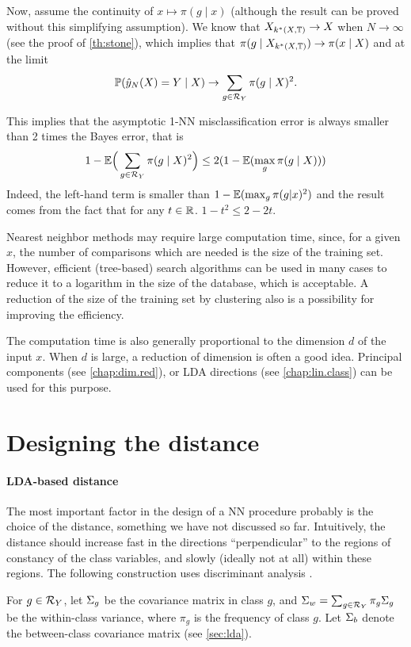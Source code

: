 Now, assume the continuity of $x\mapsto \pi(g\mid x)$ (although the result
can be proved without this
simplifying assumption). We know that $X_{k^*(X,{\mathbb T})} \to X$ when
$N\to\infty$ (see the proof of \cref{th:stone}), which implies that
$\pi(g\mid X_{k^*(X,{\mathbb T})}) \to \pi(x\mid X)$ and at the limit
$$\bm{\mathbb P}(\hat y_N(X) = Y\mid X) \to \sum_{g\in {\mathcal R}_Y} \pi( g\mid X)^2 .$$

This implies that the asymptotic 1-NN misclassification error is always smaller
than 2 times the Bayes error, that is
$$
1- \bm{\mathbb E}\Big(\sum_{g\in {\mathcal R}_Y} \pi( g\mid X)^2 \Big) \leq 2(1- \bm{\mathbb E}(\max_g \pi(
g\mid X) ))
$$
Indeed, the left-hand term is smaller than $1- \bm{\mathbb E}(\max_g \pi(g|x)^2)$
and the result comes from the fact that for any $t\in{\mathbb{R}}$. $1-t^2
\leq 2 - 2t$.

\begin{remark}
\label{rem:nn.comp}
Nearest neighbor methods may require large computation time, since, for a given $x$, the number of
comparisons which are needed is the size of the training set. However,
efficient (tree-based) search algorithms can be used in many cases to
reduce it to a logarithm in the size of the database, which is
acceptable. A reduction of the size of the training set by clustering also
is a possibility for improving the efficiency.

The computation time is also generally proportional to the dimension
$d$ of the input $x$. When $d$ is large, a reduction of dimension is
often a good idea. Principal components (see \cref{chap:dim.red}), or LDA directions (see \cref{chap:lin.class})
can be
used for this purpose.
\end{remark}

\section{Designing the distance}

\paragraph{LDA-based distance}
The most important factor in the design of a NN procedure probably is
the choice of the distance, something we have not discussed
so far. Intuitively, the distance should increase fast in the directions
``perpendicular'' to the regions of constancy of the class variables,
and slowly (ideally not at all) within these regions. The following construction uses  discriminant
analysis \cite{htf03}.

For $g\in {\mathcal R}_Y$, let $\Sigma_g$ be the covariance matrix in class $g$, and $\Sigma_w =
\sum_{g\in {\mathcal R}_Y}\pi_g \Sigma_g$ be the within-class variance, where $\pi_g$ is the
frequency of class $g$. Let $\Sigma_b$ denote the between-class covariance matrix (see \cref{sec:lda}).

